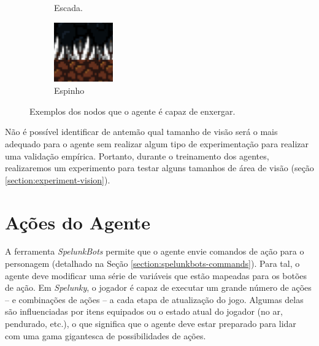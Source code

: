 \begin{figure}[H]
\begin{subfigure}[b]{0.15\textwidth}
		\caption{Escada.}
	\end{subfigure}
	\begin{subfigure}[b]{0.15\textwidth}
        \includegraphics[width=\textwidth]{fig/spelunky-spike.pdf}
		\caption{Espinho}
	\end{subfigure}
	\caption{Exemplos dos nodos que o agente é capaz de enxergar.}
	\label{fig:vision-nodes}
\end{figure}

Não é possível identificar de antemão qual tamanho de visão será o mais adequado
para o agente sem realizar algum tipo de experimentação para realizar uma
validação empírica. Portanto, durante o treinamento dos agentes, realizaremos um
experimento para testar alguns tamanhos de área de visão (seção
\ref{section:experiment-vision}).


\section{\label{section:modelling-outputs}Ações do Agente}
A ferramenta \textit{SpelunkBots} permite que o agente envie comandos de ação
para o personagem (detalhado na Seção \ref{section:spelunkbots-commands}). Para
tal, o agente deve modificar uma série de variáveis que estão mapeadas para os
botões de ação. Em \textit{Spelunky}, o jogador é capaz de executar um grande
número de ações -- e combinações de ações -- a cada etapa de atualização do
jogo. Algumas delas são influenciadas por itens equipados ou o estado atual do
jogador (no ar, pendurado, etc.), o que significa que o agente deve estar
preparado para lidar com uma gama gigantesca de possibilidades de ações.


